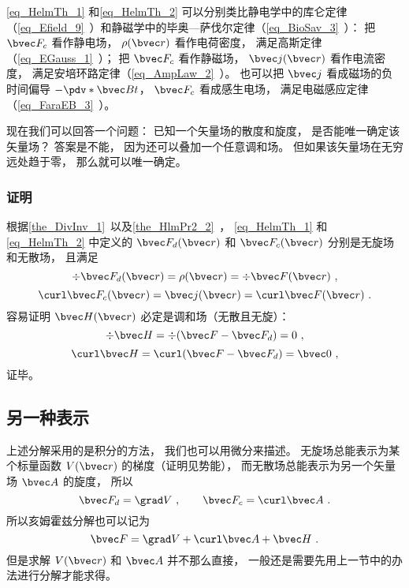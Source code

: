 \autoref{eq_HelmTh_1} 和\autoref{eq_HelmTh_2} 可以分别类比静电学中的库仑定律（\autoref{eq_Efield_9}~）和静磁学中的毕奥—萨伐尔定律（\autoref{eq_BioSav_3}~）： 把 $\bvec F_c$ 看作静电场， $\rho(\bvec r)$ 看作电荷密度， 满足高斯定律（\autoref{eq_EGauss_1}~）； 把 $\bvec F_c$ 看作静磁场， $\bvec j(\bvec r)$ 看作电流密度， 满足安培环路定律（\autoref{eq_AmpLaw_2}~）。 也可以把 $\bvec j$ 看成磁场的负时间偏导 $-\pdv*{\bvec B}{t}$， $\bvec F_c$ 看成感生电场， 满足电磁感应定律（\autoref{eq_FaraEB_3}~）。

现在我们可以回答一个问题： 已知一个矢量场的散度和旋度， 是否能唯一确定该矢量场？ 答案是不能， 因为还可以叠加一个任意调和场。 但如果该矢量场在无穷远处趋于零， 那么就可以唯一确定。

\subsubsection{证明}
根据\autoref{the_DivInv_1}~以及\autoref{the_HlmPr2_2}~， \autoref{eq_HelmTh_1} 和\autoref{eq_HelmTh_2} 中定义的 $\bvec F_{d}(\bvec r)$ 和 $\bvec F_{c}(\bvec r)$ 分别是无旋场和无散场， 且满足
\begin{equation}
\div \bvec F_d(\bvec r) = \rho(\bvec r) = \div \bvec F(\bvec r)~,
\end{equation}
\begin{equation}
\curl \bvec F_c(\bvec r) = \bvec j(\bvec r) = \curl \bvec F(\bvec r)~.
\end{equation}
容易证明 $\bvec H(\bvec r)$ 必定是调和场（无散且无旋）：
\begin{equation}
\div \bvec H = \div (\bvec F - \bvec F_d) = 0~,
\end{equation}
\begin{equation}
\curl \bvec H = \curl (\bvec F - \bvec F_d) = \bvec 0~,
\end{equation}
证毕。

\subsection{另一种表示}
上述分解采用的是积分的方法， 我们也可以用微分来描述。 无旋场总能表示为某个标量函数 $V(\bvec r)$ 的梯度（证明见势能）， 而无散场总能表示为另一个矢量场 $\bvec A$ 的旋度， 所以
\begin{equation}
\bvec F_{d} = \grad V~,\qquad \bvec F_{c} = \curl \bvec A~.
\end{equation}
所以亥姆霍兹分解也可以记为
\begin{equation}
\bvec F = \grad V + \curl \bvec A + \bvec H~.
\end{equation}
但是求解 $V(\bvec r)$ 和 $\bvec A$ 并不那么直接， 一般还是需要先用上一节中的办法进行分解才能求得。

